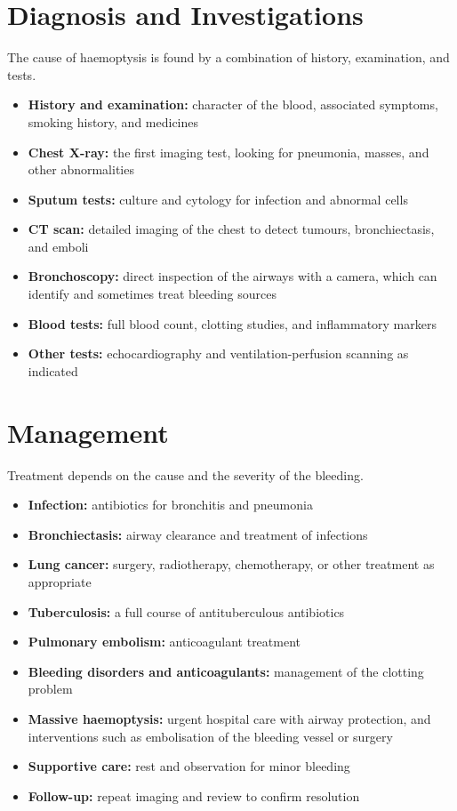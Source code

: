 \section*{Diagnosis and Investigations}
The cause of haemoptysis is found by a combination of history, examination, and tests.

\begin{itemize}
    \item \textbf{History and examination:} character of the blood, associated symptoms, smoking history, and medicines
    \item \textbf{Chest X-ray:} the first imaging test, looking for pneumonia, masses, and other abnormalities
    \item \textbf{Sputum tests:} culture and cytology for infection and abnormal cells
    \item \textbf{CT scan:} detailed imaging of the chest to detect tumours, bronchiectasis, and emboli
    \item \textbf{Bronchoscopy:} direct inspection of the airways with a camera, which can identify and sometimes treat bleeding sources
    \item \textbf{Blood tests:} full blood count, clotting studies, and inflammatory markers
    \item \textbf{Other tests:} echocardiography and ventilation-perfusion scanning as indicated
\end{itemize}

\section*{Management}
Treatment depends on the cause and the severity of the bleeding.

\begin{itemize}
    \item \textbf{Infection:} antibiotics for bronchitis and pneumonia
    \item \textbf{Bronchiectasis:} airway clearance and treatment of infections
    \item \textbf{Lung cancer:} surgery, radiotherapy, chemotherapy, or other treatment as appropriate
    \item \textbf{Tuberculosis:} a full course of antituberculous antibiotics
    \item \textbf{Pulmonary embolism:} anticoagulant treatment
    \item \textbf{Bleeding disorders and anticoagulants:} management of the clotting problem
    \item \textbf{Massive haemoptysis:} urgent hospital care with airway protection, and interventions such as embolisation of the bleeding vessel or surgery
    \item \textbf{Supportive care:} rest and observation for minor bleeding
    \item \textbf{Follow-up:} repeat imaging and review to confirm resolution
\end{itemize}

